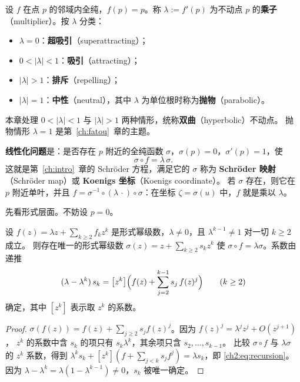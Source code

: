 设 $f$ 在点 $p$ 的邻域内全纯，$f(p)=p$。称 $\lambda:=f'(p)$ 为不动点 $p$ 的\textbf{乘子}（multiplier）。按 $\lambda$ 分类：
\begin{itemize}
\item $\lambda=0$：\textbf{超吸引}（superattracting）；
\item $0<|\lambda|<1$：\textbf{吸引}（attracting）；
\item $|\lambda|>1$：\textbf{排斥}（repelling）；
\item $|\lambda|=1$：\textbf{中性}（neutral），其中 $\lambda$ 为单位根时称为\textbf{抛物}（parabolic）。
\end{itemize}
本章处理 $0<|\lambda|<1$ 与 $|\lambda|>1$ 两种情形，统称\textbf{双曲}（hyperbolic）不动点。
抛物情形 $\lambda=1$ 是第~\ref{ch:fatou}~章的主题。

\textbf{线性化问题}是：是否存在 $p$ 附近的全纯函数 $\sigma$，$\sigma(p)=0$，$\sigma'(p)=1$，使
\begin{equation}\label{ch2:eq:schroder}
  \sigma\circ f=\lambda\,\sigma .
\end{equation}
这就是第~\ref{ch:intro}~章的 Schröder 方程，满足它的 $\sigma$ 称为 \textbf{Schröder 映射}（Schröder map）或 \textbf{Koenigs 坐标}（Koenigs coordinate）。
若 $\sigma$ 存在，则它在 $p$ 附近单叶，并且 $f=\sigma^{-1}\circ(\lambda\,\cdot)\circ\sigma$：在坐标 $\zeta=\sigma(u)$ 中，$f$ 就是乘以 $\lambda$。

先看形式层面。不妨设 $p=0$。

\begin{lemma}[形式解]\label{ch2:lem:formal}
设 $f(z)=\lambda z+\sum_{k\ge2}f_kz^k$ 是形式幂级数，$\lambda\ne0$，且 $\lambda^{k-1}\ne1$ 对一切 $k\ge2$ 成立。
则存在唯一的形式幂级数 $\sigma(z)=z+\sum_{k\ge2}s_kz^k$ 使 $\sigma\circ f=\lambda\sigma$。系数由递推
\begin{equation}\label{ch2:eq:recursion}
  (\lambda-\lambda^k)\,s_k=\bigl[z^k\bigr]\Bigl(f(z)+\sum_{j=2}^{k-1}s_j\,f(z)^j\Bigr)\qquad(k\ge2)
\end{equation}
确定，其中 $[z^k]$ 表示取 $z^k$ 的系数。
\end{lemma}

\begin{proof}
$\sigma(f(z))=f(z)+\sum_{j\ge2}s_jf(z)^j$。因为 $f(z)^j=\lambda^jz^j+O(z^{j+1})$，
$z^k$ 的系数中含 $s_k$ 的项只有 $s_k\lambda^k$，其余项只含 $s_2,\dots,s_{k-1}$。
比较 $\sigma\circ f$ 与 $\lambda\sigma$ 的 $z^k$ 系数，得到 $\lambda^ks_k+[z^k](f+\sum_{j<k}s_jf^j)=\lambda s_k$，即 \eqref{ch2:eq:recursion}。
因为 $\lambda-\lambda^k=\lambda(1-\lambda^{k-1})\ne0$，$s_k$ 被唯一确定。
\end{proof}

